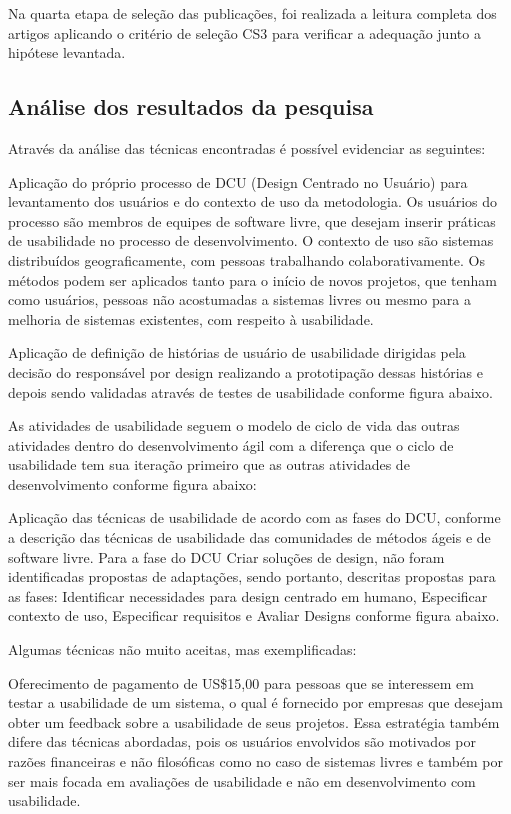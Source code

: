 \documentclass[12pt]{article}
\begin{document}
%
Na quarta etapa de seleção das publicações, foi realizada a leitura completa dos artigos aplicando o critério de seleção CS3 para verificar a adequação junto a hipótese levantada.

\subsection{Análise dos resultados da pesquisa}
Através da análise das técnicas encontradas é possível evidenciar as seguintes:

%
Aplicação do próprio processo de DCU (Design Centrado no Usuário) para levantamento dos usuários e do contexto de uso da metodologia. Os usuários do processo são membros de equipes de software livre, que desejam inserir práticas de usabilidade no processo de desenvolvimento. O contexto de uso são sistemas distribuídos geograficamente, com pessoas trabalhando colaborativamente. Os métodos podem ser aplicados tanto para o início de novos projetos, que tenham como usuários, pessoas não acostumadas a sistemas livres ou mesmo para a melhoria de sistemas existentes, com respeito à usabilidade.

%
Aplicação de definição de histórias de usuário de usabilidade dirigidas pela decisão do responsável por design realizando a prototipação dessas histórias e depois sendo validadas através de testes de usabilidade conforme figura abaixo.

%
As atividades de usabilidade seguem o modelo de ciclo de vida das outras atividades dentro do desenvolvimento ágil com a diferença que o ciclo de usabilidade tem sua iteração primeiro que as outras atividades de desenvolvimento conforme figura abaixo:

%
Aplicação das técnicas de usabilidade de acordo com as fases do DCU, conforme a descrição das técnicas de usabilidade das comunidades de métodos ágeis e de software livre. Para a fase do DCU Criar soluções de design, não foram identificadas propostas de adaptações, sendo portanto, descritas propostas para as fases: Identificar necessidades para design centrado em humano, Especificar contexto de uso, Especificar requisitos e Avaliar Designs conforme figura abaixo.

%
Algumas técnicas não muito aceitas, mas exemplificadas:

%
Oferecimento de pagamento de US\$15,00 para pessoas que se interessem em testar a usabilidade de um sistema, o qual é fornecido por empresas que desejam obter um feedback sobre a usabilidade de seus projetos. Essa estratégia também difere das técnicas abordadas, pois os usuários envolvidos são motivados por razões financeiras e não filosóficas como no caso de sistemas livres e também por ser mais focada em avaliações de usabilidade e não em desenvolvimento com usabilidade.
\end{document}

